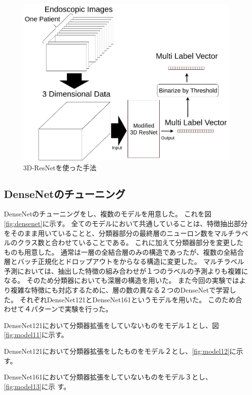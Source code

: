\begin{figure}[htbp]
    \begin{center}
        \includegraphics[width=122mm]{./fig/ieice3.png}
        \caption{3D-ResNetを使った手法}
        \label{fig:3d_resnet}
    \end{center}
\end{figure}

\newpage
\subsection{DenseNetのチューニング}

DenseNetのチューニングをし、複数のモデルを用意した。
これを図\ref{fig:densenet}に示す。
全てのモデルにおいて共通していることは、特徴抽出部分をそのまま用いていることと、分類器部分の最終層のニューロン数をマルチラベルのクラス数と合わせていることである。
これに加えて分類器部分を変更したものも用意した。
通常は一層の全結合層のみの構造であったが、複数の全結合層とバッチ正規化とドロップアウトをからなる構造に変更した。
マルチラベル予測においては、抽出した特徴の組み合わせが１つのラベルの予測よりも複雑になる。
そのため分類器においても深層の構造を用いた。
また今回の実験ではより複雑な特徴にも対応するために、層の数の異なる２つのDenseNetで学習した。
それぞれDenseNet121\cite{DenseNet}とDenseNet161\cite{DenseNet}というモデルを用いた。
このため合わせて４パターンで実験を行った。

DenseNet121において分類器拡張をしていないものをモデル１とし、図\ref{fig:model11}に示す。

DenseNet121において分類器拡張をしたものをモデル２とし、\ref{fig:model12}に示す。

DenseNet161において分類器拡張をしていないものをモデル３とし、\ref{fig:model13}に示
す。

